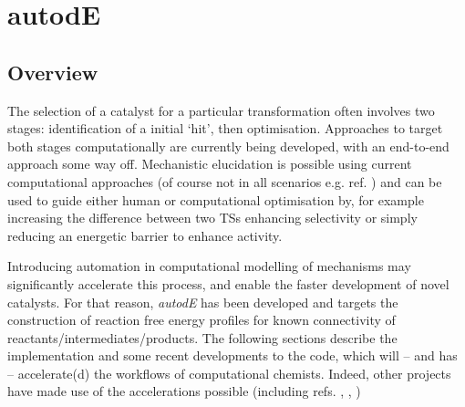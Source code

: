 \documentclass[../../main.tex]{subfiles}
\begin{document}
\setcounter{footnote}{0} 


\chapter{autodE}

\section{Overview}

The selection of a catalyst for a particular transformation often involves two stages: identification of a initial `hit', then optimisation. Approaches to target both stages computationally are currently being developed, with an end-to-end approach some way off. Mechanistic elucidation is possible using current computational approaches (of course not in all scenarios e.g. ref. \cite{Plata2015}) and can be used to guide either human or computational optimisation by, for example increasing the difference between two TSs enhancing selectivity or simply reducing an energetic barrier to enhance activity.

Introducing automation in computational modelling of mechanisms may significantly accelerate this process, and enable the faster development of novel catalysts. For that reason, \emph{autodE} has been developed and targets the construction of reaction free energy profiles for known connectivity of reactants/intermediates/products. The following sections describe the implementation and some recent developments to the code, which will -- and has -- accelerate(d) the workflows of computational chemists. Indeed, other projects have made use of the accelerations possible (including refs. \cite{Wang2020}, \cite{Branfoot2021}, \cite{Young2021GAP})


\clearpage
\end{document}
